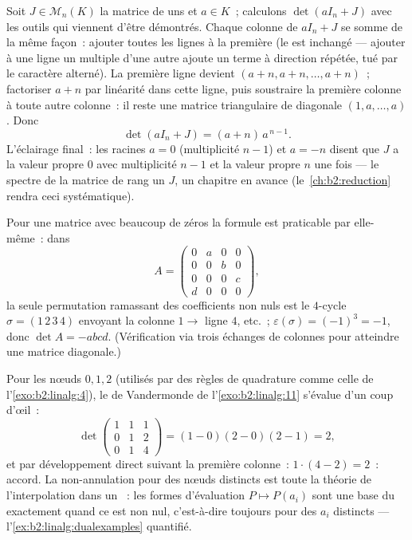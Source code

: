 \begin{example}\label{ex:b2:linalg:onesmatrix}
Soit $J \in \mathcal{M}_n(K)$ la matrice de uns et $a \in K$~;
calculons $\det(aI_n + J)$ avec les outils qui viennent d'être
démontrés. Chaque colonne de $aI_n + J$ se somme de la même façon~:
ajouter toutes les lignes à la première (le  est inchangé
--- ajouter à une ligne un multiple d'une autre ajoute un terme à
direction répétée, tué par le caractère alterné). La première ligne
devient $(a + n, a + n, \dots, a + n)$~; factoriser $a + n$ par
linéarité dans cette ligne, puis soustraire la première colonne à
toute autre colonne~: il reste une matrice triangulaire de diagonale
$(1, a, \dots, a)$. Donc
\[
\det(aI_n + J) = (a + n)\,a^{\,n-1}.
\]
L'éclairage final~: les racines $a = 0$ (multiplicité $n - 1$) et
$a = -n$ disent que $J$ a la valeur propre $0$ avec multiplicité $n - 1$
et la valeur propre $n$ une fois --- le spectre de la matrice de rang
un $J$, un chapitre en avance (le~\cref{ch:b2:reduction} rendra ceci
systématique).
\end{example}

\begin{example}\label{ex:b2:linalg:permexample}
Pour une matrice avec beaucoup de zéros la formule est praticable par
elle-même~: dans
\[
A = \begin{pmatrix}
0 & a & 0 & 0\\
0 & 0 & b & 0\\
0 & 0 & 0 & c\\
d & 0 & 0 & 0
\end{pmatrix},
\]
la seule permutation ramassant des coefficients non nuls est le
$4$-cycle $\sigma = (1\,2\,3\,4)$ envoyant la colonne $1 \to$ ligne $4$,
etc.~; $\varepsilon(\sigma) = (-1)^3 = -1$, donc $\det A = -abcd$.
(Vérification via trois échanges de colonnes pour atteindre une matrice
diagonale.)
\end{example}

\begin{example}\label{ex:b2:linalg:vandermondework}
Pour les nœuds $0, 1, 2$ (utilisés par des règles de quadrature comme
celle de l'\cref{exo:b2:linalg:4}), le  de Vandermonde de
l'\cref{exo:b2:linalg:11} s'évalue d'un coup d'œil~:
\[
\det\begin{pmatrix}
1 & 1 & 1\\
0 & 1 & 2\\
0 & 1 & 4
\end{pmatrix}
= (1 - 0)(2 - 0)(2 - 1) = 2 ,
\]
et par développement direct suivant la première colonne~: $1\cdot(4 - 2)
= 2$~: accord. La non-annulation pour des nœuds distincts est toute la
théorie de l'interpolation dans un ~: les formes
d'évaluation $P \mapsto P(a_i)$ sont une base du  exactement quand
ce  est non nul, c'est-à-dire toujours pour des $a_i$
distincts --- l'\cref{ex:b2:linalg:dualexamples} quantifié.
\end{example}

